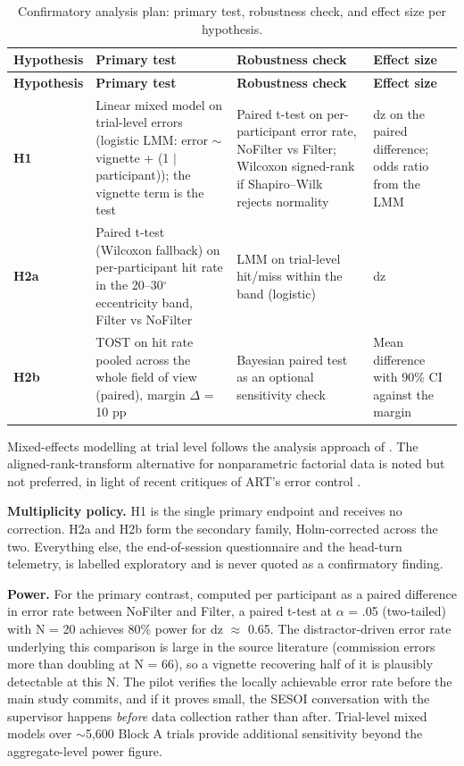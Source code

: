 \begin{longtable}{p{}|p{}|p{}|p{}}
\caption{Confirmatory analysis plan: primary test, robustness check, and effect size per hypothesis.}\\
\hline
\textbf{Hypothesis} & \textbf{Primary test} & \textbf{Robustness check} & \textbf{Effect size} \\
\hline
\endfirsthead
\hline
\textbf{Hypothesis} & \textbf{Primary test} & \textbf{Robustness check} & \textbf{Effect size} \\
\hline
\endhead
\hline
\textbf{H1} & Linear mixed model on trial-level errors (logistic LMM: error $\sim$ vignette + (1 $\mid$ participant)); the vignette term is the test & Paired t-test on per-participant error rate, NoFilter vs Filter; Wilcoxon signed-rank if Shapiro–Wilk rejects normality & dz on the paired difference; odds ratio from the LMM \\
\textbf{H2a} & Paired t-test (Wilcoxon fallback) on per-participant hit rate in the 20–30$^{\circ}$ eccentricity band, Filter vs NoFilter & LMM on trial-level hit/miss within the band (logistic) & dz \\
\textbf{H2b} & TOST on hit rate pooled across the whole field of view (paired), margin $\Delta$ = 10 pp \citep{lakens2017} & Bayesian paired test as an optional sensitivity check & Mean difference with 90\% CI against the margin \\
\hline
\end{longtable}

Mixed-effects modelling at trial level follows the analysis approach of \citet{mclaughlin2025}. The
aligned-rank-transform alternative for nonparametric factorial data \citep{wobbrock2011} is noted
but not preferred, in light of recent critiques of ART's error control \citep{tsandilas2024}.

\textbf{Multiplicity policy.} H1 is the single primary endpoint and receives no correction. H2a and H2b
form the secondary family, Holm-corrected across the two. Everything else, the end-of-session
questionnaire and the head-turn telemetry, is labelled exploratory and is never quoted as a
confirmatory finding.

\textbf{Power.} For the primary contrast, computed per participant as a paired difference in error rate
between NoFilter and Filter, a paired t-test at $\alpha$ = .05 (two-tailed) with N = 20 achieves 80\%
power for dz $\approx$ 0.65. The distractor-driven error rate underlying this comparison is large in the
source literature (commission errors more than doubling at N = 66), so a vignette recovering half of
it is plausibly detectable at this N. The pilot verifies the locally achievable error rate before the
main study commits, and if it proves small, the SESOI conversation with the supervisor happens
\textit{before} data collection rather than after. Trial-level mixed models over $\sim$5,600 Block A
trials provide additional sensitivity beyond the aggregate-level power figure.

